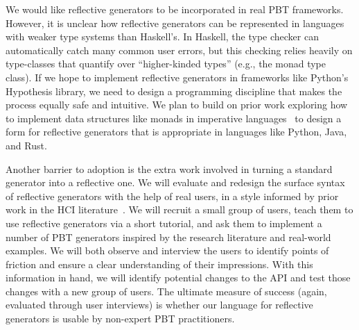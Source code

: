 %
We would like reflective generators to be incorporated in
real PBT frameworks.
%
However, it is unclear
how reflective generators can be
represented in languages with weaker type systems than Haskell's. In
Haskell, the type checker can automatically catch many
common user errors, but this checking relies heavily on type-classes that
quantify over ``higher-kinded types'' (e.g., the monad type class). If
we hope to implement
reflective generators in frameworks like Python's Hypothesis library, we need to
design a programming discipline that makes the process equally safe and
intuitive. We plan to build on prior work exploring how to implement data structures
like monads in imperative
languages~\cite{brachthauser_representing_2021, delaat_pymonad_nodate} to design
a form for reflective generators that is appropriate in languages like
Python, Java, and Rust.

Another barrier to adoption is the extra work involved in turning a standard
generator into a reflective one.
We will evaluate and redesign the surface syntax of reflective generators with
the help of real users, in a style informed by prior work in the HCI
literature~\cite{ref:ko2015practical}.  We will recruit a small group of users, teach
them to use reflective generators via a short tutorial, and ask
them to implement a number of PBT generators inspired by the research
literature and real-world examples. We will both observe and interview
the users to identify points of friction and ensure a clear understanding of their
impressions. With this information in hand, we will identify potential changes
to the API and test those changes with a new group of users.  The
ultimate measure of success (again, evaluated through user interviews)
is whether our language for reflective generators is usable by non-expert PBT
practitioners.

